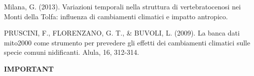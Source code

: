\documentclass[12pt]{article}
\begin{document}
\begin{thebibliography}{999} %
Milana, G. (2013). Variazioni temporali nella struttura di vertebratocenosi nei Monti della Tolfa: influenza di cambiamenti climatici e impatto antropico. 

PRUSCINI, F., FLORENZANO, G. T., & BUVOLI, L. (2009). La banca dati mito2000 come strumento per prevedere gli effetti dei cambiamenti climatici sulle specie comuni nidificanti. Alula, 16, 312-314.
\end{thebibliography}

\newpage

\hline %
\bigskip %
\textbf{IMPORTANT} %
\bigskip %
\hline %
\end{document}
